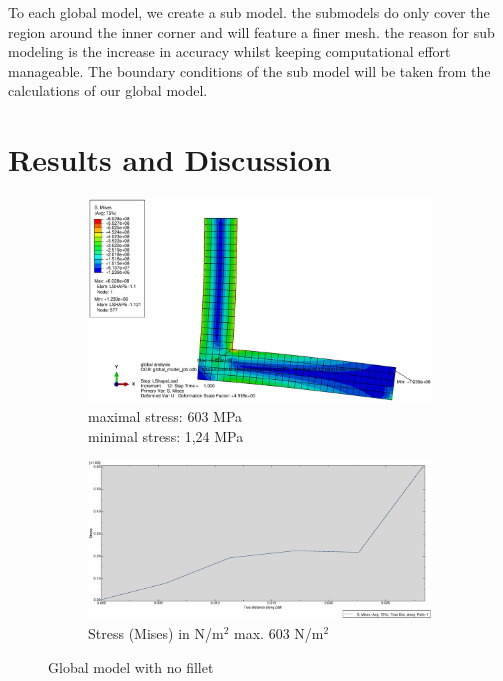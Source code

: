 \documentclass[12pt]{article}
\begin{document}
To each global model, we create a sub model. the submodels do only cover the 
region around the inner corner and will feature a finer mesh. the reason 
for sub modeling is the increase in accuracy whilst keeping computational 
effort manageable. The boundary conditions of the sub model will be taken 
from the calculations of our global model.

\pagebreak
\section{Results and Discussion}
\begin{figure}[!htb]
  \centering
  \begin{subfigure}{.5\textwidth}
    \centering
    \includegraphics[width=0.95\linewidth]{pics/CPS8R_NoFillet_Global}
    \caption{maximal stress: 603 MPa \\\hspace{\textwidth}minimal stress: 1,24 MPa}
  \end{subfigure}%
  \begin{subfigure}{.5\textwidth}
    \centering
    \includegraphics[width=0.95\linewidth]{pics/CPS8R_NoFillet_Global_Plot}
    \caption{Stress (Mises) in N/m$^{2}$ max. 603 N/m$^{2}$}
   \end{subfigure}
  \caption{Global model with no fillet}
\end{figure}
\end{document}
